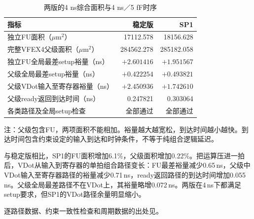 \begin{table}[!htbp]\centering
\small\setlength{\tabcolsep}{5pt}
\caption{两版的4 ns综合面积与4 ns／5 fF时序}\label{tab:3-sp1-cost}
\begin{tabular}{lrr}
\toprule
指标 & 稳定版 & SP1\\
\midrule
独立FU面积（$\mu\mathrm{m}^{2}$） & 17112.578 & 18156.628\\
完整VFEX4父级面积（$\mu\mathrm{m}^{2}$） & 284562.278 & 285182.058\\
独立FU全局最差setup裕量（ns） & $+2.601416$ & $+1.951567$\\
父级全局最差setup裕量（ns） & $+0.422254$ & $+0.493821$\\
父级VDot输入至寄存器裕量（ns） & $+2.450936$ & $+1.742610$\\
父级ready返回到达时间（ns） & 0.247821 & 0.303064\\
各类路径及全局setup检查 & 全部通过 & 全部通过\\
\bottomrule
\end{tabular}
\par\smallskip
\begin{minipage}{0.96\linewidth}\footnotesize
注：父级包含FU，两项面积不能相加。裕量越大越宽松，到达时间越小越快。到达时间包含约束设定的输入到达和时钟条件，不等于纯组合逻辑延迟。
\end{minipage}
\end{table}

与稳定版相比，SP1的FU面积增加6.1\%，父级面积增加0.22\%。把运算压进一拍后，VDot从输入到寄存器的单拍组合路径变长：FU最差裕量减少0.65\,ns，父级中VDot输入至寄存器路径的裕量减少0.71\,ns，ready返回路径的到达时间增加0.055\,ns。父级全局最差路径不在VDot上，其裕量略增0.072\,ns。两版在4\,ns下都满足setup要求，但SP1的VDot路径余量明显缩小。

逐路径数据、约束一致性检查和周期数据的出处见。
\FloatBarrier
